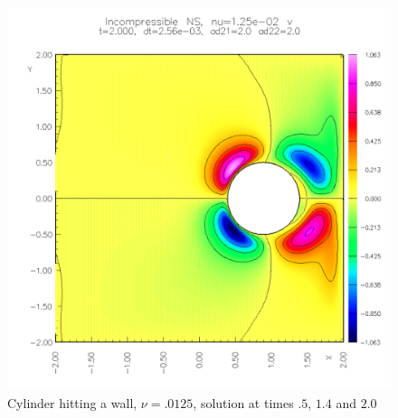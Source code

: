 {\begin{figure}
\begin{center}
\includegraphics[width=\figWidth]{figures/collide5-v-2p0}  
\end{center}
\caption{Cylinder hitting a wall, $\nu=.0125$, solution at times $.5$, $1.4$ and $2.0$} 
\end{figure}
}

